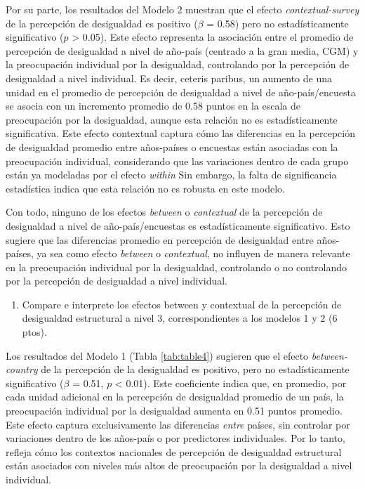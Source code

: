 \documentclass[
  12pt,
  a4paper,
]{article}
\providecommand{\tightlist}{%
  \setlength{\itemsep}{0pt}\setlength{\parskip}{0pt}}
\begin{document}
Por su parte, los resultados del Modelo 2 muestran que el efecto \emph{contextual-survey} de la percepción de desigualdad es positivo (\(\beta\) = 0.58) pero no estadísticamente significativo (\(p\) \textgreater{} 0.05). Este efecto representa la asociación entre el promedio de percepción de desigualdad a nivel de año-país (centrado a la gran media, CGM) y la preocupación individual por la desigualdad, controlando por la percepción de desigualdad a nivel individual. Es decir, ceteris paribus, un aumento de una unidad en el promedio de percepción de desigualdad a nivel de año-país/encuesta se asocia con un incremento promedio de 0.58 puntos en la escala de preocupación por la desigualdad, aunque esta relación no es estadísticamente significativa. Este efecto contextual captura cómo las diferencias en la percepción de desigualdad promedio entre años-países o encuestas están asociadas con la preocupación individual, considerando que las variaciones dentro de cada grupo están ya modeladas por el efecto \emph{within} Sin embargo, la falta de significancia estadística indica que esta relación no es robusta en este modelo.

Con todo, ninguno de los efectos \emph{between} o \emph{contextual} de la percepción de desigualdad a nivel de año-país/encuestas es estadísticamente significativo. Esto sugiere que las diferencias promedio en percepción de desigualdad entre años-países, ya sea como efecto \emph{between} o \emph{contextual}, no influyen de manera relevante en la preocupación individual por la desigualdad, controlando o no controlando por la percepción de desigualdad a nivel individual.

\begin{enumerate}
\def\labelenumi{\alph{enumi})}
\setcounter{enumi}{5}
\tightlist
\item
  Compare e interprete los efectos between y contextual de la percepción de desigualdad estructural a nivel 3, correspondientes a los modelos 1 y 2 (6 ptos).
\end{enumerate}

Los resultados del Modelo 1 (Tabla \ref{tab:table4}) sugieren que el efecto \emph{between-country} de la percepción de la desigualdad es positivo, pero no estadísticamente significativo (\(\beta\) = 0.51, \(p\) \textless{} 0.01). Este coeficiente indica que, en promedio, por cada unidad adicional en la percepción de desigualdad promedio de un país, la preocupación individual por la desigualdad aumenta en 0.51 puntos promedio. Este efecto captura exclusivamente las diferencias \emph{entre} países, sin controlar por variaciones dentro de los años-país o por predictores individuales. Por lo tanto, refleja cómo los contextos nacionales de percepción de desigualdad estructural están asociados con niveles más altos de preocupación por la desigualdad a nivel individual.
\end{document}
